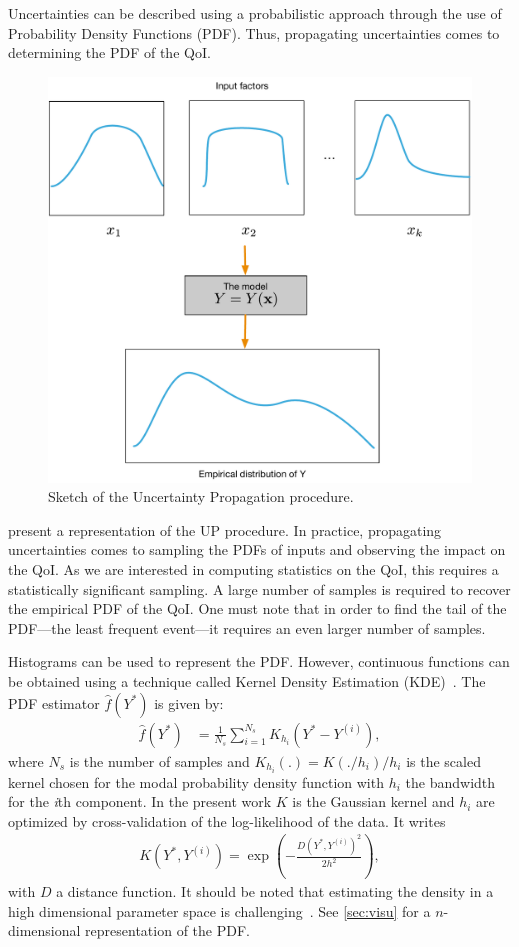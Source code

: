 Uncertainties can be described using a probabilistic approach through the use of Probability Density Functions (PDF). Thus, propagating uncertainties comes to determining the PDF of the QoI.

\begin{figure}[H]
\centering
\includegraphics[width=0.7\linewidth,keepaspectratio]{fig/literature/propagation.pdf}
\caption{Sketch of the Uncertainty Propagation procedure.}
\label{fig:UP}
\end{figure}

 present a representation of the UP procedure. In practice, propagating uncertainties comes to sampling the PDFs of inputs and observing the impact on the QoI. As we are interested in computing statistics on the QoI, this requires a statistically significant sampling. A large number of samples is required to recover the empirical PDF of the QoI. One must note that in order to find the tail of the PDF---the least frequent event---it requires an even larger number of samples.

Histograms can be used to represent the PDF. However, continuous functions can be obtained using a technique called Kernel Density Estimation (KDE)~\cite{Wand1995}. The PDF estimator $\hat{f}(Y^*)$ is given by:
\begin{align}
\hat{f}(Y^*)&= \frac{1}{N_{s}}\sum_{i=1}^{N_{s}} K_{h_i}(Y^*-Y^{(i)}),
\end{align}
\noindent where $N_s$ is the number of samples and $K_{h_i}(.) = K(./h_i)/h_i$ is the scaled kernel chosen for the modal probability density function with $h_{i}$ the bandwidth for the \emph{i}th component. In the present work $K$ is the Gaussian kernel and $h_{i}$ are optimized by cross-validation of the log-likelihood of the data. It writes
\begin{align}
K\left(Y^*,Y^{(i)}\right) = \exp\left( - \frac{D\left(Y^*,Y^{(i)}\right)^2}{2h^2} \right),
\end{align}
\noindent with $D$ a distance function. It should be noted that estimating the density in a high dimensional parameter space is challenging~\citep{Scholkopf1999,Scott2015}. See \cref{sec:visu} for a $n$-dimensional representation of the PDF.

